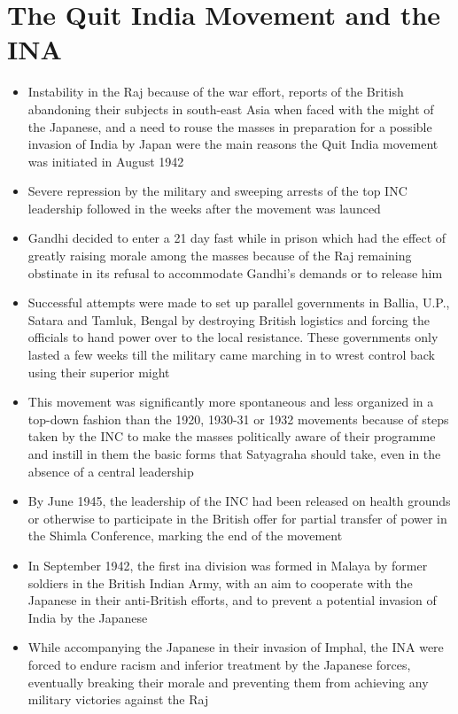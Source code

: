 \section{The Quit India Movement and the INA}
\begin{itemize}
    \item Instability in the Raj because of the war effort, reports of the British abandoning their subjects in south-east Asia when faced with the might of the Japanese, and a need to rouse the masses in preparation for a possible invasion of India by Japan were the main reasons the Quit India movement was initiated in August 1942
    \item Severe repression by the military and sweeping arrests of the top INC leadership followed in the weeks after the movement was launced
    \item Gandhi decided to enter a 21 day fast while in prison which had the effect of greatly raising morale among the masses because of the Raj remaining obstinate in its refusal to accommodate Gandhi's demands or to release him
    \item Successful attempts were made to set up parallel governments in Ballia, U.P., Satara and Tamluk, Bengal by destroying British logistics and forcing the officials to hand power over to the local resistance. These governments only lasted a few weeks till the military came marching in to wrest control back using their superior might
    \item This movement was significantly more spontaneous and less organized in a top-down fashion than the 1920, 1930-31 or 1932 movements because of steps taken by the INC to make the masses politically aware of their programme and instill in them the basic forms that Satyagraha should take, even in the absence of a central leadership
    \item By June 1945, the leadership of the INC had been released on health grounds or otherwise to participate in the British offer for partial transfer of power in the Shimla Conference, marking the end of the movement
    \item In September 1942, the first \acrshort{ina} division was formed in Malaya by former soldiers in the British Indian Army, with an aim to cooperate with the Japanese in their anti-British efforts, and to prevent a potential invasion of India by the Japanese
    \item While accompanying the Japanese in their invasion of Imphal, the INA were forced to endure racism and inferior treatment by the Japanese forces, eventually breaking their morale and preventing them from achieving any military victories against the Raj
\end{itemize}


